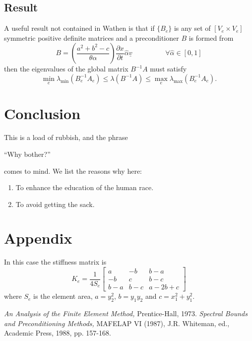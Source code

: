 \documentclass[12pt]{article}
\begin{document}
\subsection{Result}
A useful result not contained in  Wathen \cite{W88} is that
 if $\{ B_e \}$ is any
set of $[V_e \times V_e]$ symmetric positive definite
matrices and a preconditioner $B$ is formed from
\begin{displaymath}
B=\left(\frac{a^2+b^2-c}{\theta \alpha}\right)
\frac{\partial x}{\partial t}\hat{\alpha}{\underline v}
\hspace{2cm}\forall\hat{\alpha}\in[0,1]
\end{displaymath}
then the eigenvalues of the global matrix $B^{-1}A$ must
satisfy
\begin{equation}
\label{ebound}
    \min_e{\lambda_{\min}(B_e^{-1}A_e)}
    \leq \lambda (B^{-1}A) \leq
    \max_e{\lambda_{\max}(B_e^{-1}A_e)}.
\end{equation}

\section{Conclusion}
\setcounter{equation}{0}
This is a load of rubbish, and the phrase 
\begin{center}
``Why bother?'' 
\end{center}
comes to mind. We list the reasons why here:\\
\begin{enumerate}
\item To enhance the education of the human race.
\item To avoid getting the sack.
\end{enumerate}

\appendix
\section{Appendix}
\setcounter{equation}{0}
In this case the stiffness matrix is 
\begin{equation}
    K_e=\frac{1}{4S_e}
    \left[ 
    \begin{array}{ccc}
    a & -b & b-a \\
    -b & c & b-c \\
    b-a & b-c & a-2b+c  
    \end{array} 
    \right]
\end{equation}
where $S_e$ is the element area, $a=y_2^2$, $b=y_1y_2$ and 
$c=x_1^2+y_1^2$.

\begin{thebibliography}{99}
	\textit{An Analysis of the Finite Element Method,}
        Prentice-Hall, 1973.
	\textit{Spectral Bounds and Preconditioning Methods,}
         {MAFELAP VI (1987),} 
        {J.R. Whiteman, ed.,
         Academic Press, 1988, pp. 157-168.}
\end{thebibliography}

\end{document}
